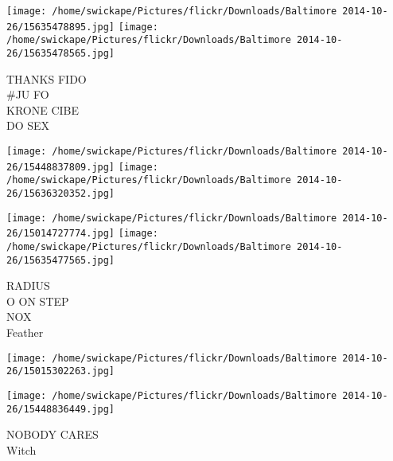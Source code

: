 \documentclass[10pt,letterpaper]{article}
\begin{document}
\texttt{[image: /home/swickape/Pictures/flickr/Downloads/Baltimore 2014-10-26/15635478895.jpg]}
\texttt{[image: /home/swickape/Pictures/flickr/Downloads/Baltimore 2014-10-26/15635478565.jpg]}

THANKS FIDO\\
\#JU FO\\
KRONE CIBE\\
DO SEX
\pagebreak

\texttt{[image: /home/swickape/Pictures/flickr/Downloads/Baltimore 2014-10-26/15448837809.jpg]}
\texttt{[image: /home/swickape/Pictures/flickr/Downloads/Baltimore 2014-10-26/15636320352.jpg]}

\texttt{[image: /home/swickape/Pictures/flickr/Downloads/Baltimore 2014-10-26/15014727774.jpg]}
\texttt{[image: /home/swickape/Pictures/flickr/Downloads/Baltimore 2014-10-26/15635477565.jpg]}

RADIUS\\
O ON STEP\\
NOX\\
Feather
\pagebreak

\texttt{[image: /home/swickape/Pictures/flickr/Downloads/Baltimore 2014-10-26/15015302263.jpg]}

\vspace{0.25in}
\texttt{[image: /home/swickape/Pictures/flickr/Downloads/Baltimore 2014-10-26/15448836449.jpg]}

NOBODY CARES\\
Witch
\pagebreak
\end{document}
